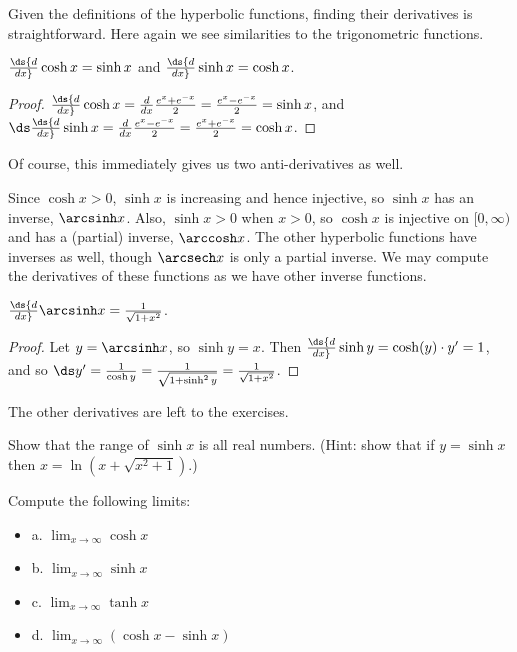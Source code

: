 \begin{theorem}
Given the definitions of the hyperbolic functions, finding their
derivatives is straightforward. Here again we see similarities to the
trigonometric functions.

\begin{theorem} $\ds{d\over dx}\cosh x=\sinh x $ and 
\label{thm:hyperbolic derivatives}
$\ds{d\over dx}\sinh x = \cosh x $.
\begin{proof}
$\ds{d\over dx}\cosh x= {d\over dx}{e^x +e^{-x}\over 2} = 
{e^x- e^{-x}\over 2} =\sinh x$, and 
$\ds\ds{d\over dx}\sinh x = {d\over dx}{e^x -e^{-x}\over 2} = 
{e^x +e^{-x }\over 2} =\cosh x$.
\end{proof}

Of course, this immediately gives us two anti-derivatives as well.

Since $\cosh x > 0$, $\sinh x$ is increasing and hence injective, so
$\sinh x$ has an inverse, $\arcsinh x$. Also, $\sinh x > 0$ when
$x>0$, so $\cosh x$ is injective on $[0,\infty)$ and has a (partial)
inverse, $\arccosh x$. The other hyperbolic functions have inverses
as well, though $\arcsech x$ is only a partial inverse. 
We may compute the derivatives of these functions as we have other
inverse functions.

\begin{theorem} $\ds{d\over dx}\arcsinh x = {1\over\sqrt{1+x^2}}$.
\begin{proof}
Let $y=\arcsinh x$, so $\sinh y=x$. Then 
$\ds{d\over dx}\sinh y = \cosh(y)\cdot y'  = 1$, and
so $\ds y' ={1\over\cosh y} ={1\over\sqrt{1 +\sinh^2 y}} =
{1\over\sqrt{1+x^2}}$.
\end{proof}

The other derivatives are left to the exercises.


\begin{exercises}

\begin{exercise} Show that the range of $\sinh x$ is all real
numbers. (Hint: show that if $y=\sinh x $ then 
$x =\ln (x+\sqrt{x^2+1})$.) 

\begin{exercise} Compute the following limits:
\begin{itemize} %

\item{a.} $ \lim_{x\to \infty } \cosh x$
\item{b.} $ \lim_{x\to \infty } \sinh x$
\item{c.} $ \lim_{x\rightarrow \infty } \tanh x$
\item{d.} $ \lim_{x\rightarrow \infty } (\cosh x -\sinh x)$


\end{itemize}
\end{exercise}
\end{exercise}
\end{exercises}
\end{theorem}
\end{theorem}
\end{theorem}
